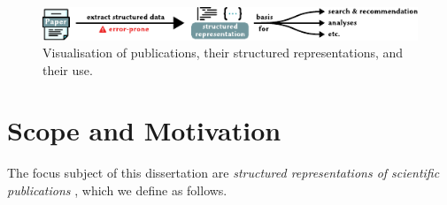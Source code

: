 

\begin{figure}[h]
  \centering
  \includegraphics[width=\linewidth]{figures/introduction/structured_representations_of_publucations}
  \caption[Visualisation of publications, their structured representations, and their use]{Visualisation of publications, their structured representations, and their use.}
  \label{fig:introduction-structreps}
\end{figure}

\section{Scope and Motivation}


% 


The focus subject of this dissertation are \textit{structured representations of scientific publications}%
, which we define as follows.

